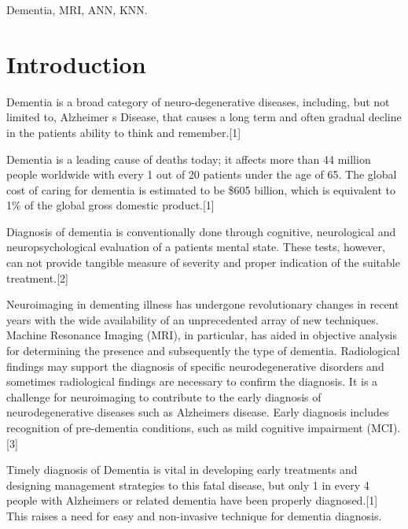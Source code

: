 \documentclass[journal,twoside]{IEEEtran}
\begin{document}
\begin{IEEEkeywords}
Dementia, MRI, ANN, KNN.
\end{IEEEkeywords}


%
\IEEEpeerreviewmaketitle

\section{Introduction}
Dementia is a broad category of neuro-degenerative diseases, including, but not limited to, Alzheimer \textquotesingle s Disease, that causes a long term and often gradual decline in the patient\textquotesingle s ability to think and remember.[1] 
\par Dementia is a leading cause of deaths today; it affects more than 44 million people worldwide with every 1 out of 20 patients under the age of 65. The global cost of caring for dementia is estimated to be \$605 billion, which is equivalent to 1\% of the global gross domestic product.[1]
\par Diagnosis of dementia is conventionally done through cognitive, neurological and neuropsychological evaluation of a patient\textquotesingle s mental state. These tests, however, can not provide tangible measure of severity and proper indication of the suitable treatment.[2]
\par Neuroimaging in dementing illness has undergone revolutionary changes in recent years with the wide availability of an unprecedented array of new techniques. Machine Resonance Imaging (MRI), in particular, has aided in objective analysis for determining the presence and subsequently the type of dementia. Radiological findings may support the diagnosis of specific neurodegenerative disorders and sometimes radiological findings are necessary to confirm the diagnosis. It is a challenge for neuroimaging to contribute to the early diagnosis of neurodegenerative diseases such as Alzheimer\textquotesingle s disease. Early diagnosis includes recognition of pre-dementia conditions, such as mild cognitive impairment (MCI). [3]
\par Timely diagnosis of Dementia is vital in developing early treatments and designing management strategies to this fatal disease, but only 1 in every 4 people with Alzheimer\textquotesingle s or related dementia have been properly diagnosed.[1] This raises a need for easy and non-invasive technique for dementia diagnosis.
\end{document}
